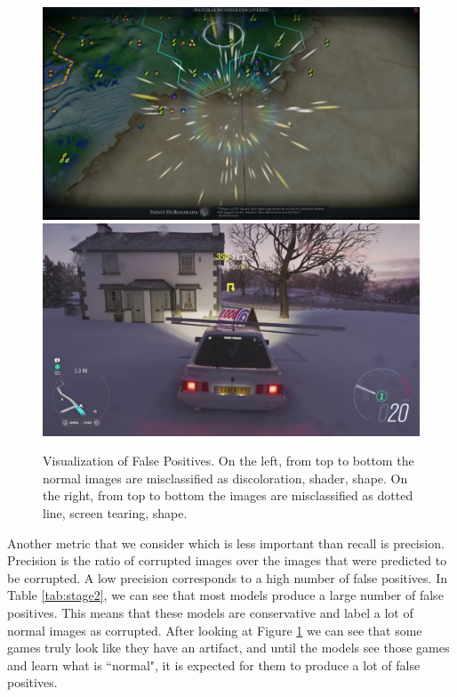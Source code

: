 \begin{figure}[h]
    \includegraphics[scale=0.11]{images/shape_56.jpg}
    \includegraphics[scale=0.11]{images/shape_91.jpg}
    \caption[Visualization of False Positives]{Visualization of False Positives. On the left, from top to bottom the normal images are misclassified as discoloration, shader, shape. On the right, from top to bottom the images are misclassified as dotted line, screen tearing, shape.}
    \label{fig:FP}
\end{figure}



\noindent Another metric that we consider which is less important than recall is precision. Precision is the ratio of corrupted images over the images that were predicted to be corrupted. A low precision corresponds to a high number of false positives. In Table \ref{tab:stage2}, we can see that most models produce a large number of false positives. This means that these models are conservative and label a lot of normal images as corrupted. After looking at Figure \ref{fig:FP} we can see that some games truly look like they have an artifact, and until the models see those games and learn what is ``normal", it is expected for them to produce a lot of false positives.\\

